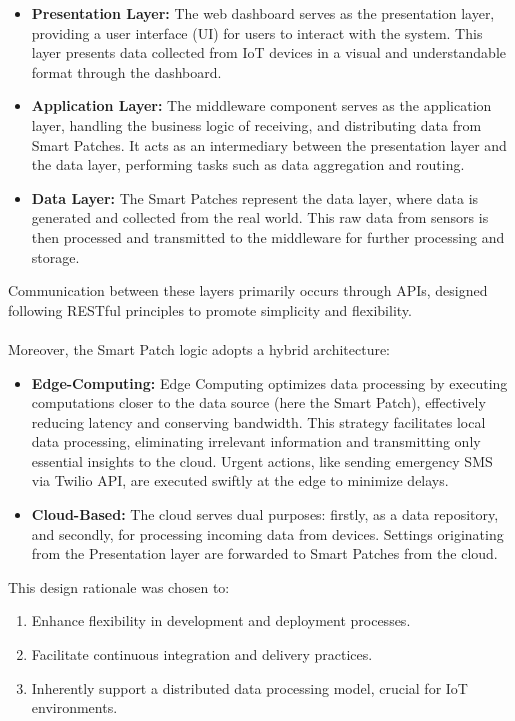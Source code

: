\begin{itemize}
    \item \textbf{Presentation Layer:}  The web dashboard serves as the presentation layer, providing a user interface (UI) for users to interact with the system. This layer presents data collected from IoT devices in a visual and understandable format through the dashboard.
    
    \item \textbf{Application Layer:} The middleware component serves as the application layer, handling the business logic of receiving, and distributing data from Smart Patches. It acts as an intermediary between the presentation layer and the data layer, performing tasks such as data aggregation and routing.
    
    \item \textbf{Data Layer:} The Smart Patches represent the data layer, where data is generated and collected from the real world. This raw data from sensors is then processed and transmitted to the middleware for further processing and storage.

    
\end{itemize}
Communication between these layers primarily occurs through APIs, designed following RESTful principles to promote simplicity and flexibility. \\ \\
Moreover, the Smart Patch logic adopts a hybrid architecture:
\begin{itemize}
    \item \textbf{Edge-Computing:} Edge Computing optimizes data processing by executing computations closer to the data source (here the Smart Patch), effectively reducing latency and conserving bandwidth. This strategy facilitates local data processing, eliminating irrelevant information and transmitting only essential insights to the cloud.  Urgent actions, like sending emergency SMS via Twilio API, are executed swiftly at the edge to minimize delays.
    
    \item \textbf{Cloud-Based:} The cloud serves dual purposes: firstly, as a data repository, and secondly, for processing incoming data from devices. Settings originating from the Presentation layer are forwarded to Smart Patches from the cloud.

\end{itemize}

\noindent This design rationale was chosen to:
\begin{enumerate}
\item Enhance flexibility in development and deployment processes.
\item Facilitate continuous integration and delivery practices.
\item Inherently support a distributed data processing model, crucial for IoT environments.
\end{enumerate}

